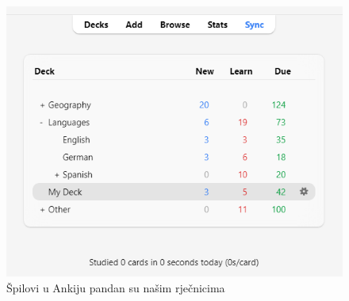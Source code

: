 \begin{figure}[H]
	\includegraphics[scale=0.8]{slike/anki_screen.png} 
	\centering
	\caption{Špilovi u Ankiju pandan su našim rječnicima}
	\label{fig:ankideck}
\end{figure}

\eject